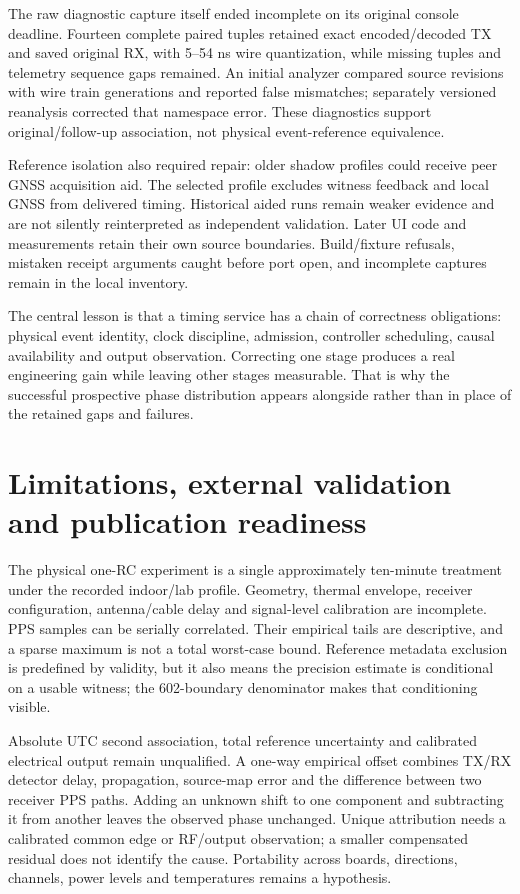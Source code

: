 \documentclass[11pt,letterpaper]{article}
\begin{document}
The raw diagnostic capture itself ended incomplete on its original console deadline. Fourteen complete paired tuples retained exact encoded/decoded TX and saved original RX, with 5--54 ns wire quantization, while missing tuples and telemetry sequence gaps remained. An initial analyzer compared source revisions with wire train generations and reported false mismatches; separately versioned reanalysis corrected that namespace error. These diagnostics support original/follow-up association, not physical event-reference equivalence.

Reference isolation also required repair: older shadow profiles could receive peer GNSS acquisition aid. The selected profile excludes witness feedback and local GNSS from delivered timing. Historical aided runs remain weaker evidence and are not silently reinterpreted as independent validation. Later UI code and measurements retain their own source boundaries. Build/fixture refusals, mistaken receipt arguments caught before port open, and incomplete captures remain in the local inventory.

The central lesson is that a timing service has a chain of correctness obligations: physical event identity, clock discipline, admission, controller scheduling, causal availability and output observation. Correcting one stage produces a real engineering gain while leaving other stages measurable. That is why the successful prospective phase distribution appears alongside rather than in place of the retained gaps and failures.

\section{Limitations, external validation and publication readiness}\label{sec:limits}
The physical one-RC experiment is a single approximately ten-minute treatment under the recorded indoor/lab profile. Geometry, thermal envelope, receiver configuration, antenna/cable delay and signal-level calibration are incomplete. PPS samples can be serially correlated. Their empirical tails are descriptive, and a sparse maximum is not a total worst-case bound. Reference metadata exclusion is predefined by validity, but it also means the precision estimate is conditional on a usable witness; the 602-boundary denominator makes that conditioning visible.

Absolute UTC second association, total reference uncertainty and calibrated electrical output remain unqualified. A one-way empirical offset combines TX/RX detector delay, propagation, source-map error and the difference between two receiver PPS paths. Adding an unknown shift to one component and subtracting it from another leaves the observed phase unchanged. Unique attribution needs a calibrated common edge or RF/output observation; a smaller compensated residual does not identify the cause. Portability across boards, directions, channels, power levels and temperatures remains a hypothesis.
\end{document}
